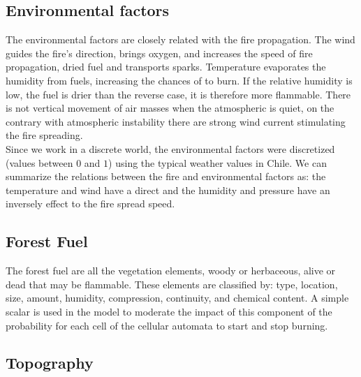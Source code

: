 \documentclass[conference]{IEEEtran}
\begin{document}
    
    
    \subsection{Environmental factors}
        
        The environmental factors are closely related with the fire propagation. The wind guides the fire’s direction, 
        brings oxygen, and increases the speed of fire propagation, dried fuel and transports sparks. Temperature evaporates
        the humidity from fuels, increasing the chances of to burn. If the relative humidity is low, the fuel is drier than 
        the reverse case, it is therefore more flammable. There is not vertical movement of air masses when the atmospheric is
        quiet, on the contrary with atmospheric instability there are strong wind current stimulating the fire spreading. \\
        
        Since we work in a discrete world, the environmental factors were discretized (values between $0$ and $1$) using the 
        typical weather values in Chile. We can summarize the relations between the fire and environmental factors as: the 
        temperature and wind have a direct and the humidity and pressure have an inversely effect to the fire spread speed. 

    
    \subsection{Forest Fuel}
    
        The forest fuel are all the vegetation elements, woody or herbaceous, alive or dead
        that may be flammable. These elements are classified by: type, location, size, amount,
        humidity, compression, continuity, and chemical content. A simple scalar
        is used in the model to moderate the impact of this component of the probability for each cell of
        the cellular automata to start and stop burning.
        
        
    \subsection{Topography}
    
\end{document}
